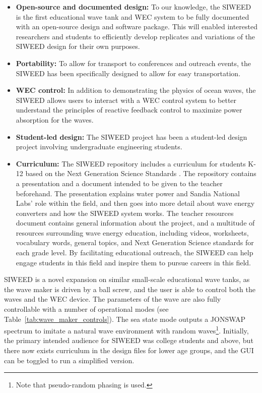 \documentclass[hardware,article,submit,pdftex,moreauthors]{Definitions/mdpi}
\begin{document}
\begin{itemize}
  \item \textbf{Open-source and documented design:} To our knowledge, the SIWEED is the first educational wave tank and WEC system to be fully documented with an open-source design and software package.
  This will enabled interested researchers and students to efficiently develop replicates and variations of the SIWEED design for their own purposes.
  \item \textbf{Portability:} To allow for transport to conferences and outreach events, the SIWEED has been specifically designed to allow for easy transportation.
  \item \textbf{WEC control:} In addition to demonstrating the physics of ocean waves, the SIWEED allows users to interact with a WEC control system to better understand the principles of reactive feedback control to maximize power absorption for the waves.
  \item \textbf{Student-led design:} The SIWEED project has been a student-led design project involving undergraduate engineering students.
  \item \textbf{Curriculum:} The SIWEED repository includes a curriculum for students K-12 based on the Next Generation Science Standards \cite{NextGenScience2021}. 
  The repository contains a presentation and a document intended to be given to the teacher beforehand. 
  The presentation explains water power and Sandia National Labs' role within the field, and then goes into more detail about wave energy converters and how the SIWEED system works.
  The teacher resources document contains general information about the project, and a multitude of resources surrounding wave energy education, including videos, worksheets, vocabulary words, general topics, and Next Generation Science standards for each grade level.
  By facilitating educational outreach, the SIWEED can help engage students in this field and inspire them to pursue careers in this field.
\end{itemize}

SIWEED is a novel expansion on similar small-scale educational wave tanks, as the wave maker is driven by a ball screw, and the user is able to control both the waves and the WEC device.
The parameters of the wave are also fully controllable with a number of operational modes (see Table~\ref{tab:wave_maker_controls}).
The sea state mode outputs a JONSWAP spectrum \cite{Hasselmann1973} to imitate a natural wave environment with random waves\footnote{Note that pseudo-random phasing is used.}.
Initially, the primary intended audience for SIWEED was college students and above, but there now exists curriculum in the design files for lower age groups, and the GUI can be toggled to run a simplified version.
\end{document}
